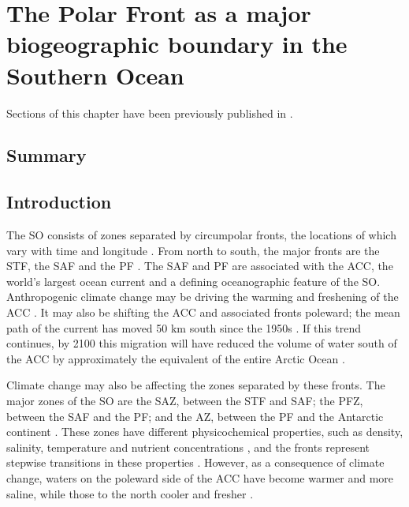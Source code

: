 \chapter{The Polar Front as a major biogeographic boundary in the Southern Ocean} 
\label{ch:polarfront}

Sections of this chapter have been previously published in .

\section{Summary}

\section{Introduction}

The \ac{SO} consists of zones separated by circumpolar fronts, the locations of which vary with time and longitude \cite{Whitworth:1980wo,Orsi:1995va,Sokolov:2002tc}.
From north to south, the major fronts are the \ac{STF}, the \ac{SAF} and the \ac{PF} .
The \ac{SAF} and \ac{PF} are associated with the \ac{ACC}, the world's largest ocean current and a defining oceanographic feature of the \ac{SO}.
Anthropogenic climate change may be driving the warming and freshening of the \ac{ACC} \cite{Boning:2008il}.
It may also be shifting the \ac{ACC} and associated fronts poleward; the mean path of the current has moved \textapprox{} 50 km south since the 1950s \cite{Gille:2002fr}.
If this trend continues, by 2100 this migration will have reduced the volume of water south of the \ac{ACC} by approximately the equivalent of the entire Arctic Ocean \cite{Fyfe:2005vp}.

Climate change may also be affecting the zones separated by these fronts.
The major zones of the \ac{SO} are the \ac{SAZ}, between the \ac{STF} and \ac{SAF}; the \ac{PFZ}, between the \ac{SAF} and the \ac{PF}; and the \ac{AZ}, between the \ac{PF} and the Antarctic continent .
These zones have different physicochemical properties, such as density, salinity, temperature and nutrient concentrations \cite{Sokolov:2002tc}, and the fronts represent stepwise transitions in these properties \cite{WhitworthIII:1987ky}.
However, as a consequence of climate change, waters on the poleward side of the \ac{ACC} have become warmer and more saline, while those to the north cooler and fresher \cite{Boning:2008il}.

